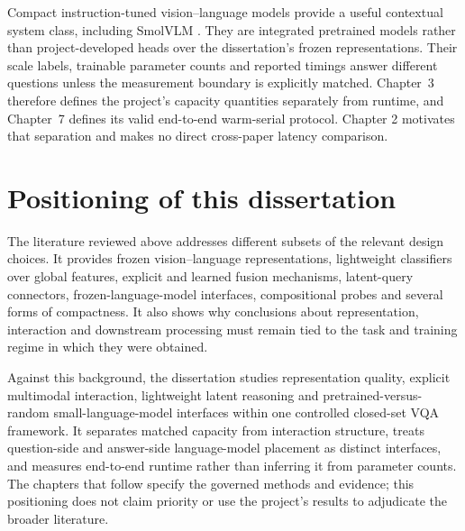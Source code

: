 Compact instruction-tuned vision--language models provide a useful contextual system class, including SmolVLM \citep{marafioti2025smolvlm}.
They are integrated pretrained models rather than project-developed heads over the dissertation's frozen representations. Their scale labels, trainable parameter counts and reported timings answer different questions unless the measurement boundary is explicitly matched. Chapter~3 therefore defines the project's capacity quantities separately from runtime, and Chapter~7 defines its valid end-to-end warm-serial protocol. Chapter 2 motivates that separation and makes no direct cross-paper latency comparison.

\section{Positioning of this dissertation}
\label{sec:ch2-positioning}

The literature reviewed above addresses different subsets of the relevant design choices. It provides frozen vision--language representations, lightweight classifiers over global features, explicit and learned fusion mechanisms, latent-query connectors, frozen-language-model interfaces, compositional probes and several forms of compactness. It also shows why conclusions about representation, interaction and downstream processing must remain tied to the task and training regime in which they were obtained.

Against this background, the dissertation studies representation quality, explicit multimodal interaction, lightweight latent reasoning and pretrained-versus-random small-language-model interfaces within one controlled closed-set VQA framework. It separates matched capacity from interaction structure, treats question-side and answer-side language-model placement as distinct interfaces, and measures end-to-end runtime rather than inferring it from parameter counts. The chapters that follow specify the governed methods and evidence; this positioning does not claim priority or use the project's results to adjudicate the broader literature.
